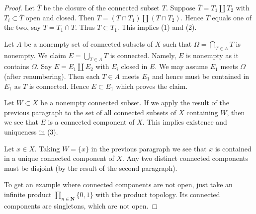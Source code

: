 \documentclass[10pt,a4paper]{amsart}
\theoremstyle{plain}
\theoremstyle{definition}
\theoremstyle{remark}
\numberwithin{equation}{subsection}
\begin{document}
\begin{proof}
Let $\overline{T}$ be the closure of the connected subset $T$.
Suppose $\overline{T} = T_1 \amalg T_2$ with $T_i \subset \overline{T}$
open and closed. Then $T = (T\cap T_1) \amalg (T \cap T_2)$. Hence
$T$ equals one of the two, say $T = T_1 \cap T$. Thus
$\overline{T} \subset T_1$. This implies (1) and (2).

\medskip\noindent
Let $A$ be a nonempty set of connected subsets of $X$ such that
$\Omega = \bigcap_{T \in A} T$ is nonempty. We claim $E = \bigcup_{T \in A} T$
is connected. Namely, $E$ is nonempty as it contains $\Omega$.
Say $E = E_1 \amalg E_2$ with $E_i$ closed in $E$. We may assume
$E_1$ meets $\Omega$ (after renumbering). Then each $T \in A$ meets $E_1$
and hence must be contained in $E_1$ as $T$ is connected. Hence $E \subset E_1$
which proves the claim.

\medskip\noindent
Let $W \subset X$ be a nonempty connected subset.
If we apply the result of the previous paragraph to the set of all
connected subsets of $X$ containing $W$, then we see that $E$ is
a connected component of $X$. This implies existence and uniqueness in (3).

\medskip\noindent
Let $x \in X$. Taking $W = \{x\}$ in the previous paragraph
we see that $x$ is contained in a unique connected component of $X$.
Any two distinct connected components must be disjoint (by the
result of the second paragraph).

\medskip\noindent
To get an example where connected components are not open, just take
an infinite product $\prod_{n \in \mathbf{N}} \{0, 1\}$
with the product topology. Its connected components are singletons,
which are not open.
\end{proof}
\end{document}

